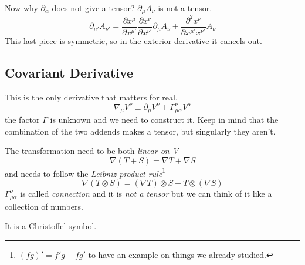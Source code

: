 Now why $\partial_{\alpha }$ does not give a tensor? $\partial_{\mu }A_{\nu }$ is not a tensor.
\[
	\partial_{\mu '}A_{\nu '} = \frac{\partial x^{\mu }}{\partial x^{\mu '}} \frac{\partial x^{\nu }}{\partial x^{\nu '}} \partial_{\mu } A_{\nu } + \frac{\partial^{2}x^{\nu }}{\partial x^{\mu '}x^{\nu '}} A_{\nu }
\]
This last piece is symmetric, so in the exterior derivative it cancels out.\par

\subsection{Covariant Derivative}

This is the only derivative that matters for real.
\[
\nabla_{\mu }V^{\nu } \equiv \partial_{\mu }V^{\nu } + \Gamma ^{\nu }_{\mu \alpha }V^{\alpha }		
\]
the factor $\Gamma $ is unknown and we need to construct it. Keep in mind that the combination of the two addends makes a tensor, but singularly they aren't.

The transformation need to be both \emph{linear on V}
\[
\nabla \left( T+S \right) = \nabla T + \nabla S
\]
and needs to follow the \emph{Leibniz product rule}\footnote{ $\left( fg \right)' = f'g + fg'$ to have an example on things we already studied.}
\[
\nabla \left( T \otimes S \right) = \left( \nabla T \right) \otimes S + T \otimes \left( \nabla S \right)
\]
$\Gamma^{\nu }_{\mu \alpha }$ is called \emph{connection} and it is \emph{not a tensor} but we can think of it like a collection of numbers. \par
It is a Christoffel symbol.\par


